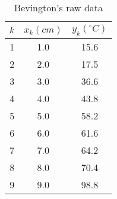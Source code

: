 \begin{table}[t]
	\begin{center}
		\begin{tabular}{rcc}
		  $k$ & $x_{k} (cm) $ & $y_{k} (^{\circ}C)$ \\\hline
		  1 & 1.0   & 15.6 \\
		  2 & 2.0   & 17.5 \\
		  3 & 3.0   & 36.6 \\
		  4 & 4.0   & 43.8 \\
		  5 & 5.0   & 58.2 \\
		  6 & 6.0   & 61.6 \\
		  7 & 7.0   & 64.2 \\
		  8 & 8.0   & 70.4 \\
		  9 & 9.0   & 98.8 \\
		\end{tabular}
	\end{center}
	\caption{Bevington's raw data}
	\label{tab:bevington data}
\end{table}%

\endinput  %